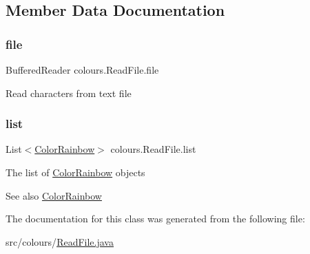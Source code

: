 \subsection{Member Data Documentation}
\mbox{\label{classcolours_1_1_read_file_a3d7ab6f2517fbc88e36249963255930a}} 
\subsubsection{\texorpdfstring{file}{file}}
{\footnotesize\ttfamily Buffered\+Reader colours.\+Read\+File.\+file\hspace{0.3cm}{\ttfamily [private]}}

Read characters from text file \mbox{\label{classcolours_1_1_read_file_ada4823ab03166bb5b0c388b40460fa7d}} 
\subsubsection{\texorpdfstring{list}{list}}
{\footnotesize\ttfamily List$<$\hyperlink{classcolours_1_1_color_rainbow}{Color\+Rainbow}$>$ colours.\+Read\+File.\+list\hspace{0.3cm}{\ttfamily [private]}}

The list of \hyperlink{classcolours_1_1_color_rainbow}{Color\+Rainbow} objects \begin{DoxySeeAlso}{See also}
\hyperlink{classcolours_1_1_color_rainbow}{Color\+Rainbow} 
\end{DoxySeeAlso}


The documentation for this class was generated from the following file\+:\begin{DoxyCompactItemize}
\item 
src/colours/\hyperlink{_read_file_8java}{Read\+File.\+java}\end{DoxyCompactItemize}
